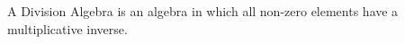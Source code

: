 \begin{definition}\label{d:division-algebra}
	A Division Algebra is an algebra in which all non-zero elements have a multiplicative inverse.
\end{definition}
